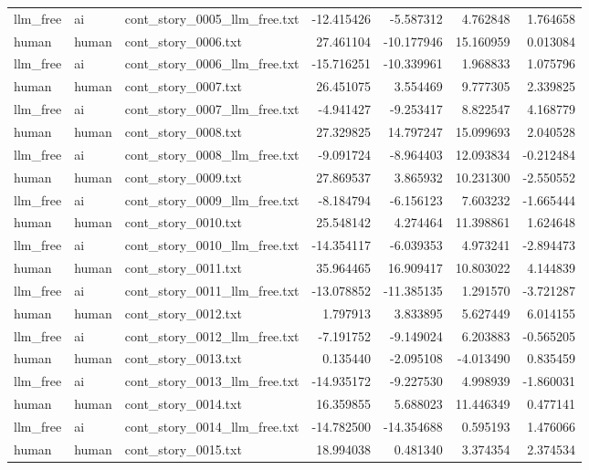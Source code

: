 \begin{longtable}{lllrrrr}
llm\_free & ai & cont\_story\_0005\_llm\_free.txt & -12.415426 & -5.587312 & 4.762848 & 1.764658 \\
human & human & cont\_story\_0006.txt & 27.461104 & -10.177946 & 15.160959 & 0.013084 \\
llm\_free & ai & cont\_story\_0006\_llm\_free.txt & -15.716251 & -10.339961 & 1.968833 & 1.075796 \\
human & human & cont\_story\_0007.txt & 26.451075 & 3.554469 & 9.777305 & 2.339825 \\
llm\_free & ai & cont\_story\_0007\_llm\_free.txt & -4.941427 & -9.253417 & 8.822547 & 4.168779 \\
human & human & cont\_story\_0008.txt & 27.329825 & 14.797247 & 15.099693 & 2.040528 \\
llm\_free & ai & cont\_story\_0008\_llm\_free.txt & -9.091724 & -8.964403 & 12.093834 & -0.212484 \\
human & human & cont\_story\_0009.txt & 27.869537 & 3.865932 & 10.231300 & -2.550552 \\
llm\_free & ai & cont\_story\_0009\_llm\_free.txt & -8.184794 & -6.156123 & 7.603232 & -1.665444 \\
human & human & cont\_story\_0010.txt & 25.548142 & 4.274464 & 11.398861 & 1.624648 \\
llm\_free & ai & cont\_story\_0010\_llm\_free.txt & -14.354117 & -6.039353 & 4.973241 & -2.894473 \\
human & human & cont\_story\_0011.txt & 35.964465 & 16.909417 & 10.803022 & 4.144839 \\
llm\_free & ai & cont\_story\_0011\_llm\_free.txt & -13.078852 & -11.385135 & 1.291570 & -3.721287 \\
human & human & cont\_story\_0012.txt & 1.797913 & 3.833895 & 5.627449 & 6.014155 \\
llm\_free & ai & cont\_story\_0012\_llm\_free.txt & -7.191752 & -9.149024 & 6.203883 & -0.565205 \\
human & human & cont\_story\_0013.txt & 0.135440 & -2.095108 & -4.013490 & 0.835459 \\
llm\_free & ai & cont\_story\_0013\_llm\_free.txt & -14.935172 & -9.227530 & 4.998939 & -1.860031 \\
human & human & cont\_story\_0014.txt & 16.359855 & 5.688023 & 11.446349 & 0.477141 \\
llm\_free & ai & cont\_story\_0014\_llm\_free.txt & -14.782500 & -14.354688 & 0.595193 & 1.476066 \\
human & human & cont\_story\_0015.txt & 18.994038 & 0.481340 & 3.374354 & 2.374534 \\

\end{longtable}

